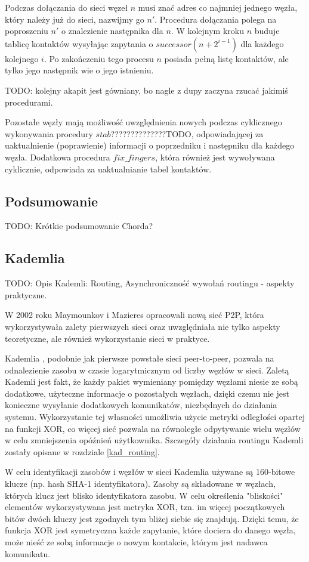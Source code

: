 \documentclass[a4paper,11pt]{scrartcl}
\begin{document}
Podczas dołączania do sieci węzeł $n$ musi znać adres co najmniej jednego węzła, który należy już do sieci, nazwijmy go $n'$. Procedura dołączania polega na poproszeniu $n'$ o znalezienie następnika dla $n$. W kolejnym kroku $n$ buduje tablicę kontaktów wysyłając zapytania o $successor(n + 2^{i-1})$ dla każdego kolejnego $i$. Po zakończeniu tego procesu $n$ posiada pełną listę kontaktów, ale tylko jego następnik wie o jego istnieniu.

TODO: kolejny akapit jest gówniany, bo nagle z dupy zaczyna rzucać jakimiś procedurami.

Pozostałe węzły mają możliwość uwzględnienia nowych podczas cyklicznego wykonywania procedury $stab$??????????????TODO, odpowiadającej za uaktualnienie (poprawienie) informacji o poprzedniku i następniku dla każdego węzła. Dodatkowa procedura $fix\_fingers$, która również jest wywoływana cyklicznie, odpowiada za uaktualnianie tabel kontaktów.

\subsection{Podsumowanie}
TODO: Krótkie podsumowanie Chorda?


\subsection{Kademlia}
TODO: Opis Kademli\cite{maymounkov2002kademlia}: Routing, Asynchroniczność wywołań routingu - aspekty praktyczne.

W 2002 roku Maymounkov i Mazieres opracowali nową sieć P2P, która wykorzystywała zalety pierwszych sieci oraz uwzględniała nie tylko aspekty teoretyczne, ale również wykorzystanie sieci w praktyce.

Kademlia \cite{maymounkov2002kademlia}, podobnie jak pierwsze powstałe sieci peer-to-peer, pozwala na odnalezienie zasobu w czasie logarytmicznym od liczby węzłów w sieci. Zaletą Kademli jest fakt, że każdy pakiet wymieniany pomiędzy węzłami niesie ze sobą dodatkowe, użyteczne informacje o pozostałych węzłach, dzięki czemu nie jest konieczne wysyłanie dodatkowych komunikatów, niezbędnych do działania systemu. Wykorzystanie tej własności umożliwia użycie metryki odległości opartej na funkcji XOR, co więcej sieć pozwala na równoległe odpytywanie wielu węzłów w celu zmniejszenia opóźnień użytkownika. Szczegóły działania routingu Kademli zostały opisane w rozdziale \ref{kad_routing}.

W celu identyfikacji zasobów i węzłów w sieci Kademlia używane są 160-bitowe klucze (np. hash SHA-1 identyfikatora). Zasoby są składowane w węzłach, których klucz jest blisko identyfikatora zasobu. W celu określenia "bliskości" elementów wykorzystywana jest metryka XOR, tzn. im więcej początkowych bitów dwóch kluczy jest zgodnych tym bliżej siebie się znajdują. Dzięki temu, że funkcja XOR jest symetryczna każde zapytanie, które dociera do danego węzła, może nieść ze sobą informacje o nowym kontakcie, którym jest nadawca komunikatu.
\end{document}
